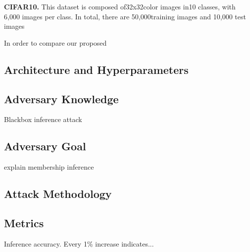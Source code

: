 \noindent\textbf{CIFAR10.} This dataset is composed of32x32color images in10 classes, with 6,000 images per class. In total, there are 50,000training images and 10,000 test images

In order to compare our proposed

\subsection{Architecture and Hyperparameters}


\begin{table}[!htb]
\caption{Architectures for CIFAR10 and FashionMNIST datasets.}
\centering
\renewcommand\arraystretch{1.5}
\fontsize{6.7pt}{6.7pt}\selectfont
{}
\label{tab:architectures}
\end{table}



\subsection{Adversary Knowledge}
Blackbox inference attack

\subsection{Adversary Goal}
explain membership inference

\subsection{Attack Methodology}

\subsection{Metrics}

Inference accuracy. Every 1\% increase indicates...
